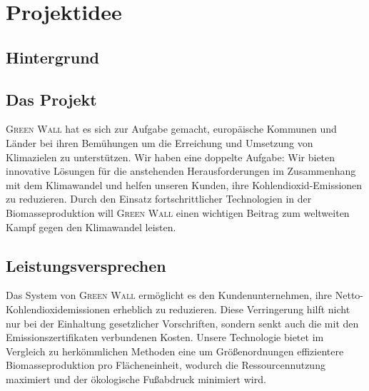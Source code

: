 \chapter{Projektidee}

\section{Hintergrund}

\section{Das Projekt}
\textsc{Green Wall} hat es sich zur Aufgabe gemacht, europäische Kommunen und Länder bei ihren Bemühungen um die Erreichung und Umsetzung von Klimazielen zu unterstützen.
Wir haben eine doppelte Aufgabe: Wir bieten innovative Lösungen für die anstehenden Herausforderungen im Zusammenhang mit dem Klimawandel und helfen unseren Kunden, ihre Kohlendioxid-Emissionen zu reduzieren.
Durch den Einsatz fortschrittlicher Technologien in der Biomasseproduktion will \textsc{Green Wall} einen wichtigen Beitrag zum weltweiten Kampf gegen den Klimawandel leisten.

\section{Leistungsversprechen}
Das System von \textsc{Green Wall} ermöglicht es den Kundenunternehmen, ihre Netto-Kohlendioxidemissionen erheblich zu reduzieren.
Diese Verringerung hilft nicht nur bei der Einhaltung gesetzlicher Vorschriften, sondern senkt auch die mit den Emissionszertifikaten verbundenen Kosten.
Unsere Technologie bietet im Vergleich zu herkömmlichen Methoden eine um Größenordnungen effizientere Biomasseproduktion pro Flächeneinheit, wodurch die Ressourcennutzung maximiert und der ökologische Fußabdruck minimiert wird.

